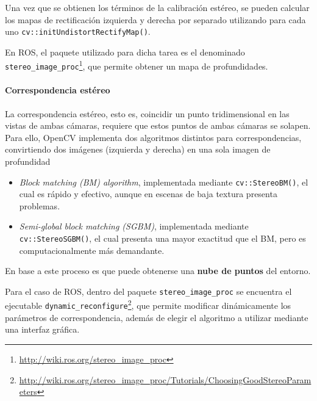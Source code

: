 Una vez que se obtienen los términos de la calibración estéreo, se pueden calcular los mapas de rectificación izquierda y derecha por separado utilizando para cada uno \texttt{cv::initUndistortRectifyMap()}.

En ROS, el paquete utilizado para dicha tarea es el denominado \texttt{stereo\_image\_proc}\footnote{\url{http://wiki.ros.org/stereo_image_proc}}, que permite obtener un mapa de profundidades. 

\paragraph{Correspondencia estéreo}
La correspondencia estéreo, esto es, coincidir un punto tridimensional en las vistas de ambas cámaras, requiere que estos puntos de ambas cámaras se solapen. Para ello, OpenCV implementa dos algoritmos distintos para correspondencias, convirtiendo dos imágenes (izquierda y derecha) en una sola imagen de profundidad
\begin{itemize}
    \item \textit{Block matching (BM) algorithm}, implementada mediante \texttt{cv::StereoBM()}, el cual es rápido y efectivo, aunque en escenas de baja textura presenta problemas. 
    \item \textit{Semi-global block matching (SGBM)}, implementada mediante \texttt{cv::StereoSGBM()}, el cual presenta una mayor exactitud que el BM, pero es computacionalmente más demandante.
\end{itemize}

En base a este proceso es que puede obtenerse una \textbf{nube de puntos} del entorno.

Para el caso de ROS, dentro del paquete \texttt{stereo\_image\_proc} se encuentra el ejecutable \texttt{dynamic\_reconfigure}\footnote{\url{http://wiki.ros.org/stereo_image_proc/Tutorials/ChoosingGoodStereoParameters}}, que permite modificar dinámicamente los parámetros de correspondencia, además de elegir el algoritmo a utilizar mediante una interfaz gráfica.

